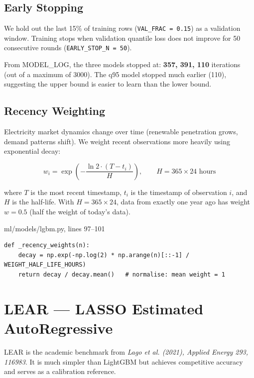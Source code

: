 \documentclass[12pt, a4paper, oneside]{memoir}
\newcommand{\code}[1]{\texttt{\footnotesize #1}}
\begin{document}
\subsection{Early Stopping}

We hold out the last 15\% of training rows (\code{VAL\_FRAC = 0.15}) as a validation
window. Training stops when validation quantile loss does not improve for 50 consecutive
rounds (\code{EARLY\_STOP\_N = 50}).

From MODEL\_LOG, the three models stopped at: \textbf{357, 391, 110} iterations
(out of a maximum of 3000). The q95 model stopped much earlier (110), suggesting
the upper bound is easier to learn than the lower bound.

\subsection{Recency Weighting}

Electricity market dynamics change over time (renewable penetration grows, demand
patterns shift). We weight recent observations more heavily using exponential decay:

\begin{keyidea}
\[
  w_i = \exp\!\left(-\frac{\ln 2 \cdot (T - t_i)}{H}\right), \qquad H = 365 \times 24 \text{ hours}
\]

where $T$ is the most recent timestamp, $t_i$ is the timestamp of observation $i$,
and $H$ is the half-life. With $H = 365 \times 24$, data from exactly one year ago
has weight $w = 0.5$ (half the weight of today's data).
\end{keyidea}

\begin{codefile}{ml/models/lgbm.py, lines 97--101}
\begin{verbatim}
def _recency_weights(n):
    decay = np.exp(-np.log(2) * np.arange(n)[::-1] / WEIGHT_HALF_LIFE_HOURS)
    return decay / decay.mean()   # normalise: mean weight = 1
\end{verbatim}
\end{codefile}

\section{LEAR --- LASSO Estimated AutoRegressive}

LEAR is the academic benchmark from
\textit{Lago et al. (2021), Applied Energy 293, 116983}. It is much simpler than
LightGBM but achieves competitive accuracy and serves as a calibration reference.
\end{document}
